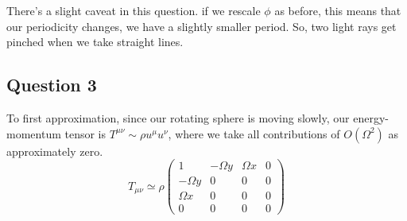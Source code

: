 There's a slight caveat in this question. 
if we rescale $ \phi $ as before, 
this means that our periodicity changes, 
we have a slightly smaller period. 
So, two light rays get pinched when we 
take straight lines. 

\pagebreak 

\subsection{Question 3} 
To first approximation, since our rotating sphere is moving 
slowly, our energy-momentum tensor 
is $ T^{ \mu \nu } \sim \rho u ^{ \mu } u ^{ \nu } $, 
where we take all contributions of $ O \left(  \Omega ^ 2  \right)  $ 
as approximately zero. 
\[
T_{ \mu \nu } \simeq \rho 
\begin{pmatrix}  1 & - \Omega y & \Omega x & 0 
\\ - \Omega y & 0 & 0 & 0 
\\ \Omega x & 0 & 0 & 0 \\
0 & 0 & 0 & 0 \end{pmatrix} 
\] 
